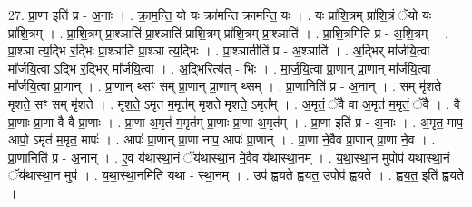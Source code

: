 \documentclass[17pt]{extarticle}
\begin{document}
27. प्रा॒णा इति॑ प्र - अ॒नाः । . क्रा॒म॒न्ति॒ यो यः क्रा॑मन्ति क्रामन्ति॒ यः । . यः प्रा॑शि॒त्रम् प्रा॑शि॒त्रं ॅयो यः प्रा॑शि॒त्रम् । . प्रा॒शि॒त्रम् प्रा॒श्ञाति॑ प्रा॒श्ञाति॑ प्राशि॒त्रम् प्रा॑शि॒त्रम् प्रा॒श्ञाति॑ । . प्रा॒शि॒त्रमिति॑ प्र - अ॒शि॒त्रम् । . प्रा॒श्ञा त्य॒द्भि र॒द्भिः प्रा॒श्ञाति॑ प्रा॒श्ञा त्य॒द्भिः । . प्रा॒श्ञातीति॑ प्र - अ॒श्ञाति॑ । . अ॒द्भिर् मा᳚र्जयि॒त्वा मा᳚र्जयि॒त्वा ऽद्भि र॒द्भिर् मा᳚र्जयि॒त्वा । . अ॒द्भिरित्य॑त् - भिः । . मा॒र्ज॒यि॒त्वा प्रा॒णान् प्रा॒णान् मा᳚र्जयि॒त्वा मा᳚र्जयि॒त्वा प्रा॒णान् । . प्रा॒णान् थ्सꣳ सम् प्रा॒णान् प्रा॒णान् थ्सम् । . प्रा॒णानिति॑ प्र - अ॒नान् । . सम् मृ॑शते मृशते॒ सꣳ सम् मृ॑शते । . मृ॒श॒ते॒ ऽमृत॑ म॒मृत॑म् मृशते मृशते॒ ऽमृत᳚म् । . अ॒मृतं॒ ॅवै वा अ॒मृत॑ म॒मृतं॒ ॅवै । . वै प्रा॒णाः प्रा॒णा वै वै प्रा॒णाः । . प्रा॒णा अ॒मृत॑ म॒मृत॑म् प्रा॒णाः प्रा॒णा अ॒मृत᳚म् । . प्रा॒णा इति॑ प्र - अ॒नाः । . अ॒मृत॒ माप॒ आपो॒ ऽमृत॑ म॒मृत॒ मापः॑ । . आपः॑ प्रा॒णान् प्रा॒णा नाप॒ आपः॑ प्रा॒णान् । . प्रा॒णा ने॒वैव प्रा॒णान् प्रा॒णा ने॒व । . प्रा॒णानिति॑ प्र - अ॒नान् । . ए॒व य॑थास्था॒नं ॅय॑थास्था॒न मे॒वैव य॑थास्था॒नम् । . य॒था॒स्था॒न मुपोप॑ यथास्था॒नं ॅय॑थास्था॒न मुप॑ । . य॒था॒स्था॒नमिति॑ यथा - स्था॒नम् । . उप॑ ह्वयते ह्वयत॒ उपोप॑ ह्वयते । . ह्व॒य॒त॒ इति॑ ह्वयते । \newline
\end{document}
